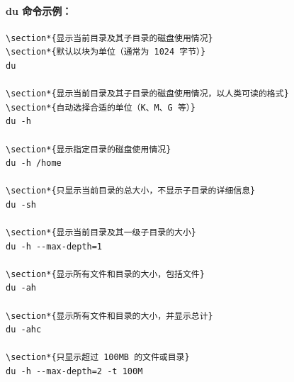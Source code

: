 \documentclass[12pt,UTF8]{ctexbook}
\begin{document}
\paragraph{du 命令示例：}
\begin{verbatim}
\section*{显示当前目录及其子目录的磁盘使用情况}
\section*{默认以块为单位（通常为 1024 字节）}
du

\section*{显示当前目录及其子目录的磁盘使用情况，以人类可读的格式}
\section*{自动选择合适的单位（K、M、G 等）}
du -h

\section*{显示指定目录的磁盘使用情况}
du -h /home

\section*{只显示当前目录的总大小，不显示子目录的详细信息}
du -sh

\section*{显示当前目录及其一级子目录的大小}
du -h --max-depth=1

\section*{显示所有文件和目录的大小，包括文件}
du -ah

\section*{显示所有文件和目录的大小，并显示总计}
du -ahc

\section*{只显示超过 100MB 的文件或目录}
du -h --max-depth=2 -t 100M


\end{verbatim}
\end{document}
